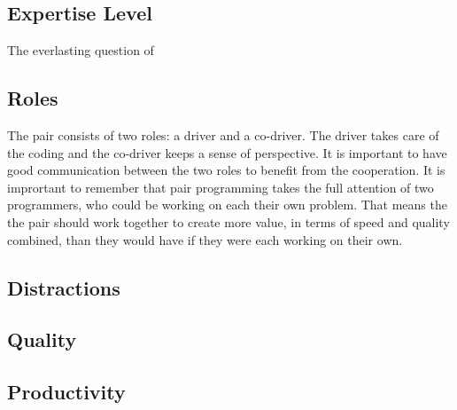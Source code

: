 \subsection{Expertise Level}
The everlasting question of 




\subsection{Roles}
The pair consists of two roles: a driver and a co-driver.
The driver takes care of the coding and the co-driver keeps a sense of perspective.
It is important to have good communication between the two roles to benefit from the cooperation.
It is imprortant to remember that pair programming takes the full attention of two programmers, who could be working on each their own problem.
That means the the pair should work together to create more value, in terms of speed and quality combined, than they would have if they were each working on their own.


\subsection{Distractions}



\subsection{Quality}



\subsection{Productivity}






